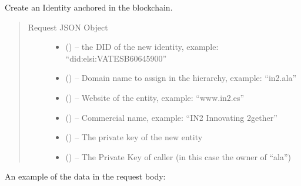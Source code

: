 \documentclass[a4paper,12pt,english,openany]{sphinxmanual}
\begin{document}
\begin{savenotes}\begin{fulllineitems}
\sphinxAtStartPar
Create an Identity anchored in the blockchain.
\begin{quote}\begin{description}
\item[{Request JSON Object}] \leavevmode\begin{itemize}
\item {} 
\sphinxAtStartPar
{} () – the DID of the new identity, example: “did:elsi:VATES\sphinxhyphen{}B60645900”

\item {} 
\sphinxAtStartPar
{} () – Domain name to assign in the hierarchy, example: “in2.ala”

\item {} 
\sphinxAtStartPar
{} () – Website of the entity, example: “www.in2.es”

\item {} 
\sphinxAtStartPar
{} () – Commercial name, example: “IN2 Innovating 2gether”

\item {} 
\sphinxAtStartPar
{} () – The private key of the new entity

\item {} 
\sphinxAtStartPar
{} () – The Private Key of caller (in this case the owner of “ala”)

\end{itemize}

\end{description}\end{quote}

\sphinxAtStartPar
An example of the data in the request body:


\end{fulllineitems}
\end{savenotes}
\end{document}
